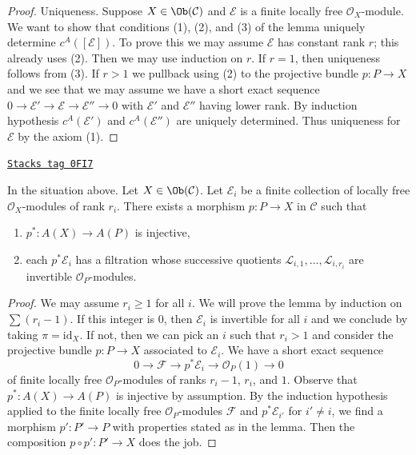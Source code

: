 \begin{proof}
\medskip\noindent
Uniqueness. Suppose $X \in \Ob(\mathcal{C})$ and $\mathcal{E}$
is a finite locally free $\mathcal{O}_X$-module. We want to show
that conditions (1), (2), and (3) of the lemma uniquely determine
$c^A([\mathcal{E}])$. To prove this we may assume $\mathcal{E}$
has constant rank $r$; this already uses (2). Then we may use induction on $r$.
If $r = 1$, then uniqueness follows from (3).
If $r > 1$ we pullback using (2) to the projective bundle $p : P \to X$
and we see that we may assume we have a short exact sequence
$0 \to \mathcal{E}' \to \mathcal{E} \to \mathcal{E}'' \to 0$
with $\mathcal{E}'$ and $\mathcal{E}''$ having lower rank.
By induction hypothesis $c^A(\mathcal{E}')$ and $c^A(\mathcal{E}'')$
are uniquely determined. Thus uniqueness for $\mathcal{E}$ by
the axiom (1).
\end{proof}

\begin{lemma}
\label{weil-lemma-splitting-principle}
\href{https://stacks.math.columbia.edu/tag/0FI7}{\texttt{Stacks tag 0FI7}}

In the situation above. Let $X \in \Ob(\mathcal{C})$. Let $\mathcal{E}_i$
be a finite collection of locally free $\mathcal{O}_X$-modules of rank $r_i$.
There exists a morphism $p : P \to X$ in $\mathcal{C}$ such that
\begin{enumerate}
\item $p^* : A(X) \to A(P)$ is injective,
\item each $p^*\mathcal{E}_i$ has a filtration whose successive quotients
$\mathcal{L}_{i, 1}, \ldots, \mathcal{L}_{i, r_i}$
are invertible $\mathcal{O}_P$-modules.
\end{enumerate}
\end{lemma}

\begin{proof}
We may assume $r_i \geq 1$ for all $i$. We will prove the lemma by induction
on $\sum (r_i - 1)$. If this integer is $0$, then $\mathcal{E}_i$
is invertible for all $i$ and we conclude by taking $\pi = \text{id}_X$.
If not, then we can pick an $i$ such that $r_i > 1$ and consider the
projective bundle $p : P \to X$ associated to $\mathcal{E}_i$.
We have a short exact sequence
$$
0 \to \mathcal{F} \to p^*\mathcal{E}_i \to \mathcal{O}_P(1) \to 0
$$
of finite locally free $\mathcal{O}_P$-modules of ranks $r_i - 1$,
$r_i$, and $1$. Observe that $p^* : A(X) \to A(P)$ is injective
by assumption. By the induction hypothesis applied to the finite locally free
$\mathcal{O}_P$-modules $\mathcal{F}$ and $p^*\mathcal{E}_{i'}$
for $i' \not = i$, we find a morphism $p' : P' \to P$ with
properties stated as in the lemma. Then the composition
$p \circ p' : P' \to X$ does the job.
\end{proof}

